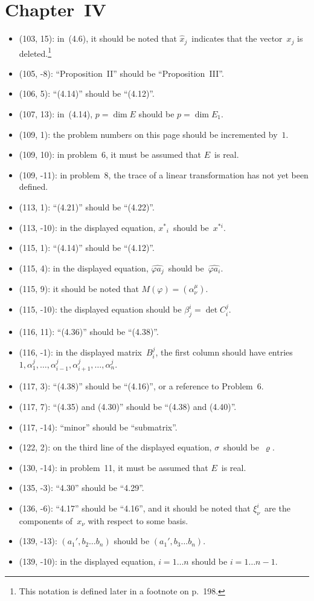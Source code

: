 \documentclass[letterpaper,12pt]{article}
\begin{document}
\section*{Chapter~IV}
\begin{itemize}
\item (103, 15): in~(4.6), it should be noted that \(\hat{x}_j\)~indicates that the vector~\(x_j\) is deleted.\footnote{This notation is defined later in a footnote on p.~198.}
\item (105, -8): ``Proposition~II'' should be ``Proposition~III''.
\item (106, 5): ``(4.14)'' should be ``(4.12)''.
\item (107, 13): in~(4.14), \(p=\dim E\) should be \(p=\dim E_1\).
\item (109, 1): the problem numbers on this page should be incremented by~\(1\).
\item (109, 10): in problem~6, it must be assumed that \(E\)~is real.
\item (109, -11): in problem~8, the trace of a linear transformation has not yet been defined.
\item (113, 1): ``(4.21)'' should be ``(4.22)''.
\item (113, -10): in the displayed equation, \({x^*}_i\)~should be~\(x^{*i}\).
\item (115, 1): ``(4.14)'' should be ``(4.12)''.
\item (115, 4): in the displayed equation, \(\widehat{\varphi a_j}\)~should be~\(\widehat{\varphi a_i}\).
\item (115, 9): it should be noted that \(M(\varphi)=(\alpha^{\mu}_{\nu})\).
\item (115, -10): the displayed equation should be \(\beta^i_j=\det C^j_i\).
\item (116, 11): ``(4.36)'' should be ``(4.38)''.
\item (116, -1): in the displayed matrix~\(B^j_i\), the first column should have entries \(1,\alpha^j_1,\ldots,\alpha^j_{i-1},\alpha^j_{i+1},\ldots,\alpha^j_n\).
\item (117, 3): ``(4.38)'' should be ``(4.16)'', or a reference to Problem~6.
\item (117, 7): ``(4.35) and (4.30)'' should be ``(4.38) and (4.40)''.
\item (117, -14): ``minor'' should be ``submatrix''.
\item (122, 2): on the third line of the displayed equation, \(\sigma\)~should be~\(\varrho\).
\item (130, -14): in problem~11, it must be assumed that \(E\)~is real.
\item (135, -3): ``4.30'' should be ``4.29''.
\item (136, -6): ``4.17'' should be ``4.16'', and it should be noted that \(\xi^i_{\nu}\)~are the components of~\(x_{\nu}\) with respect to some basis.
\item (139, -13): \((a_1',b_2\ldots b_n)\) should be \((a_1',b_3\ldots b_n)\).
\item (139, -10): in the displayed equation, \(i=1\ldots n\) should be \(i=1\ldots n-1\).
\end{itemize}
\end{document}
